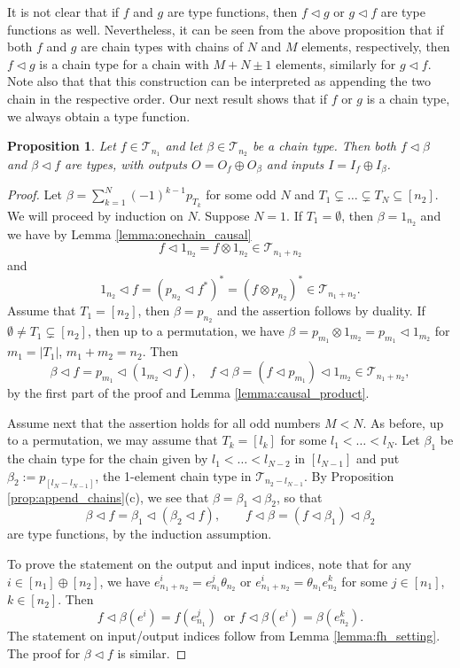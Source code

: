 \documentclass[12pt]{article}
\newtheorem{prop}{Proposition}
\theoremstyle{definition}
\theoremstyle{remark}
\def\Te{\mathcal T}
\def\vtl{\vartriangleleft}
\begin{document}
It is not clear that if $f$ and $g$ are type functions, then $f\vtl g$ or $g\vtl
f$ are type functions as well. Nevertheless, it can be seen from the above proposition
that if both $f$ and $g$ are chain types with chains of $N$ and $M$ elements,
respectively, then $f\vtl g$ is a chain type for a chain with $M+N\pm 1$
elements, similarly for $g\vtl f$. Note also that that this construction can be
interpreted as appending the two chain in the respective order. 
Our next result shows that if $f$ or $g$ is a chain type, we always obtain a type
function.




\begin{prop}\label{prop:append_chain_f}  Let $f\in \Te_{n_1}$ and let $\beta\in \Te_{n_2}$
be a chain type. Then both $f\vtl \beta$ and $\beta\vtl f$ are types, with outputs
$O=O_f\oplus O_\beta$ and inputs $I=I_f\oplus I_\beta$. 

\end{prop}

\begin{proof} Let  $\beta=\sum_{k=1}^{N}(-1)^{k-1}p_{T_k}$
for some odd $N$ and $T_1\subsetneq \dots \subsetneq T_N\subseteq [n_2]$. We will proceed by induction on $N$. Suppose $N=1$. If $T_1=\emptyset$,
then $\beta=1_{n_2}$ and we have by Lemma \ref{lemma:onechain_causal}
\[
f\vtl 1_{n_2}=f\otimes 1_{n_2}\in \Te_{n_1+n_2}
\]
and
\[
1_{n_2}\vtl f=(p_{n_2}\vtl f^*)^*=(f\otimes p_{n_2})^*\in \Te_{n_1+n_2}.
\]
Assume that  $T_1=[n_2]$, then $\beta=p_{n_2}$ and the assertion follows by duality. 
If $\emptyset\ne T_1\subsetneq [n_2]$, then up to a permutation, we have $\beta=p_{m_1}\otimes
1_{m_2}=p_{m_1}\vtl 1_{m_2}$ for $m_1=|T_1|$, $m_1+m_2=n_2$. Then 
\[
\beta\vtl f=p_{m_1}\vtl (1_{m_2}\vtl f),\quad f\vtl \beta=(f\vtl p_{m_1})\vtl 1_{m_2} \in
\Te_{n_1+n_2},
\]
by the first part of the proof and Lemma \ref{lemma:causal_product}.

Assume next that the assertion holds for all odd numbers $M<N$. As before, up to a
permutation, we may assume that $T_k=[l_k]$ for some $l_1<\dots<l_{N}$. Let $\beta_1$ be the chain
type for the chain given by $l_1<\dots<l_{N-2}$ in $[l_{N-1}]$ and put
$\beta_2:=p_{[l_{N}-l_{N-1}]}$, the 1-element chain type in $\Te_{n_2-l_{N-1}}$. By
Proposition \ref{prop:append_chains}(c), we see
that $\beta=\beta_1\vtl\beta_2$, so that 
\[
\beta\vtl f=\beta_1\vtl(\beta_2\vtl f),\qquad f\vtl\beta=(f\vtl\beta_1)\vtl\beta_2
\]
are type functions, by the induction assumption. 


To prove the statement on the output and input indices, note that for any $i\in [n_1]\oplus [n_2]$, we have  $e^i_{n_1+n_2}=e^j_{n_1}\theta_{n_2}$ or
$e^i_{n_1+n_2}=\theta_{n_1}e^k_{n_2}$
for some $j\in [n_1]$, $k\in [n_2]$. Then   
\[
f\vtl\beta(e^i)=f(e^j_{n_1})\ \text{ or } f\vtl \beta(e^i)=\beta(e^k_{n_2}).
\]
The statement on input/output indices  follow from Lemma \ref{lemma:fh_setting}. The proof
for $\beta\vtl f$ is similar. 

\end{proof}
\end{document}
